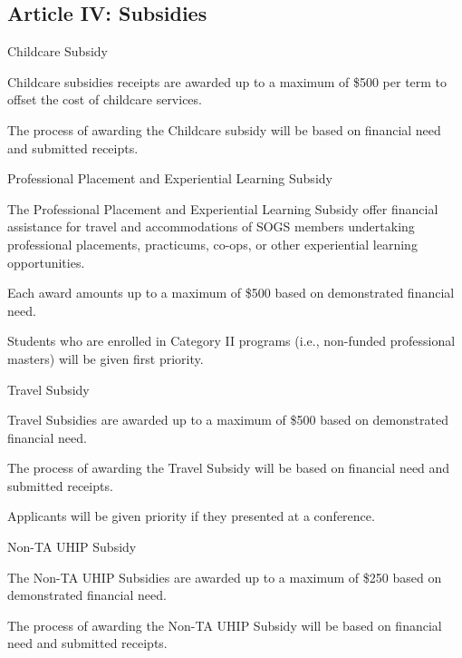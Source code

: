 \subsection{Article IV: Subsidies}
\begin{longenum}[ label*=\thesubsection.\arabic*., align=left]
	\item Childcare Subsidy
		\begin{longenum}[ label*=\arabic*., align=left]	
		\item Childcare subsidies receipts are awarded up to a maximum of \$500 per term to offset the cost of childcare services.
		\item The process of awarding the Childcare subsidy will be based on financial need and submitted receipts.
		\end{longenum}
	\item Professional Placement and Experiential Learning Subsidy
		\begin{longenum}[ label*=\arabic*., align=left]	
		\item The Professional Placement and Experiential Learning Subsidy offer financial assistance for travel and accommodations of SOGS members undertaking professional placements, practicums, co-ops, or other experiential learning opportunities. 
		\item Each award amounts up to a maximum of \$500 based on demonstrated financial need.
		\item Students who are enrolled in Category II programs (i.e., non-funded professional masters) will be given first priority.
		\end{longenum}
	\item Travel Subsidy
		\begin{longenum}[ label*=\arabic*., align=left]	
		\item Travel Subsidies are awarded up to a maximum of \$500 based on demonstrated financial need.
		\item The process of awarding the Travel Subsidy will be based on financial need and submitted receipts.
		\item Applicants will be given priority if they presented at a conference.
		\end{longenum}
	\item Non-TA UHIP Subsidy
		\begin{longenum}[ label*=\arabic*., align=left]	
		\item The Non-TA UHIP Subsidies are awarded up to a maximum of \$250 based on demonstrated financial need.
		\item The process of awarding the Non-TA UHIP Subsidy will be based on financial need and submitted receipts.	

\end{longenum}
\end{longenum}
